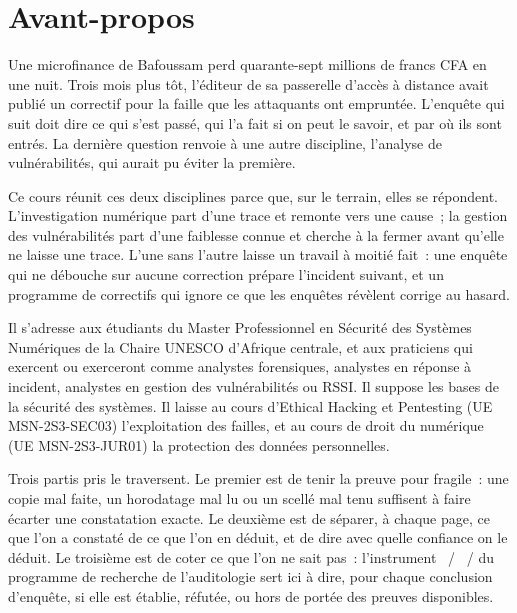 
\chapter*{Avant-propos}

Une microfinance de Bafoussam perd quarante-sept millions de francs CFA en
une nuit. Trois mois plus tôt, l'éditeur de sa passerelle d'accès à distance
avait publié un correctif pour la faille que les attaquants ont empruntée.
L'enquête qui suit doit dire ce qui s'est passé, qui l'a fait si on peut le
savoir, et par où ils sont entrés. La dernière question renvoie à une autre
discipline, l'analyse de vulnérabilités, qui aurait pu éviter la première.

Ce cours réunit ces deux disciplines parce que, sur le terrain, elles se
répondent. L'investigation numérique part d'une trace et remonte vers une
cause~; la gestion des vulnérabilités part d'une faiblesse connue et cherche
à la fermer avant qu'elle ne laisse une trace. L'une sans l'autre laisse un
travail à moitié fait~: une enquête qui ne débouche sur aucune correction
prépare l'incident suivant, et un programme de correctifs qui ignore ce que
les enquêtes révèlent corrige au hasard.

Il s'adresse aux étudiants du Master Professionnel en Sécurité des Systèmes
Numériques de la Chaire UNESCO d'Afrique centrale, et aux praticiens qui
exercent ou exerceront comme analystes forensiques, analystes en réponse à
incident, analystes en gestion des vulnérabilités ou RSSI. Il suppose les
bases de la sécurité des systèmes. Il laisse au cours d'Ethical Hacking et
Pentesting (UE MSN-2S3-SEC03) l'exploitation des failles, et au cours de
droit du numérique (UE MSN-2S3-JUR01) la protection des données
personnelles.

Trois partis pris le traversent. Le premier est de tenir la preuve pour
fragile~: une copie mal faite, un horodatage mal lu ou un scellé mal tenu
suffisent à faire écarter une constatation exacte. Le deuxième est de
séparer, à chaque page, ce que l'on a constaté de ce que l'on en déduit, et
de dire avec quelle confiance on le déduit. Le troisième est de coter ce que
l'on ne sait pas~: l'instrument \OUI{}~/ \NON{}~/ \NEK{} du programme de
recherche de l'auditologie sert ici à dire, pour chaque conclusion
d'enquête, si elle est établie, réfutée, ou hors de portée des preuves
disponibles.

